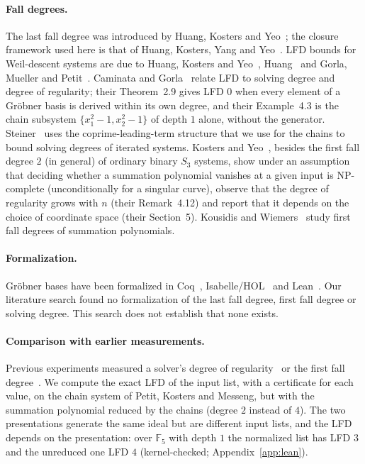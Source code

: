 \documentclass[11pt]{article}
\theoremstyle{definition}\newtheorem{definition}[theorem]{Definition}
\theoremstyle{remark}\newtheorem{remark}[theorem]{Remark}
\newcommand{\F}{\mathbb F}
\begin{document}
\paragraph{Fall degrees.} The last fall degree was introduced by Huang,
Kosters and Yeo~\cite{hky15}; the closure framework used here is that of
Huang, Kosters, Yang and Yeo~\cite{hkyy}. LFD bounds for Weil-descent systems are
due to Huang, Kosters and Yeo~\cite{hky15}, Huang~\cite{huang21} and Gorla,
Mueller and Petit~\cite{gmp21}. Caminata and Gorla~\cite{cg} relate LFD to
solving degree and degree of regularity; their Theorem~2.9 gives LFD $0$
when every element of a Gr\"obner basis is derived within its own degree,
and their
Example~4.3 is the chain subsystem $\{x_1^2-1,x_2^2-1\}$ of depth $1$
alone, without the generator.
Steiner~\cite{steiner24} uses the coprime-leading-term structure that we use
for the chains to bound solving degrees of iterated systems. Kosters and
Yeo~\cite{ky}, besides the first fall degree $2$ (in general) of ordinary
binary $S_3$ systems, show under an assumption that deciding whether a
summation polynomial vanishes at a given input is NP-complete
(unconditionally for a singular curve), observe that the degree of
regularity grows with $n$ (their Remark~4.12) and report that it depends on
the choice of coordinate space (their Section~5). Kousidis and
Wiemers~\cite{kw19} study first fall degrees of summation polynomials.

\paragraph{Formalization.} Gr\"obner bases have been formalized in
Coq~\cite{thery01}, Isabelle/HOL~\cite{maletzky-immler18} and
Lean~\cite{guo26}. Our literature search found no formalization of the last fall degree,
first fall degree or solving degree. This search does not establish that none exists.

\paragraph{Comparison with earlier measurements.} Previous experiments
measured a solver's degree of regularity~\cite{pkm,gg} or the first fall
degree~\cite{ky,kw19}. We compute the exact LFD of the input list, with a
certificate for each value, on the chain system of Petit, Kosters and
Messeng, but with the summation polynomial reduced by the chains (degree $2$
instead of $4$). The two presentations generate the same ideal but are
different input lists, and the LFD depends on the presentation: over $\F_5$
with depth $1$ the normalized list has LFD $3$ and the unreduced one LFD $4$
(kernel-checked; Appendix~\ref{app:lean}).
\end{document}
